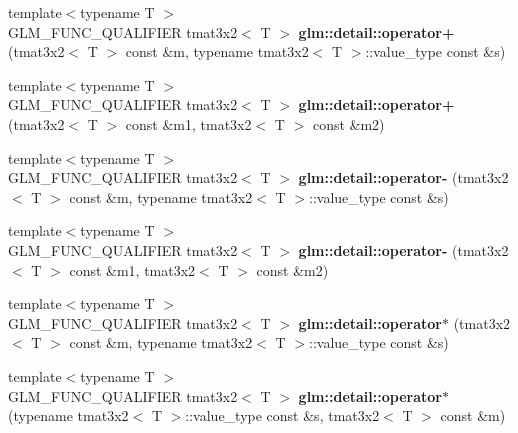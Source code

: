\begin{DoxyCompactItemize}
\item 
\hypertarget{namespaceglm_1_1detail_aaeb82124fa2780bfad15998b5477a608}{{\footnotesize template$<$typename T $>$ }\\G\-L\-M\-\_\-\-F\-U\-N\-C\-\_\-\-Q\-U\-A\-L\-I\-F\-I\-E\-R tmat3x2$<$ T $>$ {\bfseries glm\-::detail\-::operator+} (tmat3x2$<$ T $>$ const \&m, typename tmat3x2$<$ T $>$\-::value\-\_\-type const \&s)}\label{namespaceglm_1_1detail_aaeb82124fa2780bfad15998b5477a608}

\item 
\hypertarget{namespaceglm_1_1detail_a8e53f62ae79a8147b4206cfa062535bf}{{\footnotesize template$<$typename T $>$ }\\G\-L\-M\-\_\-\-F\-U\-N\-C\-\_\-\-Q\-U\-A\-L\-I\-F\-I\-E\-R tmat3x2$<$ T $>$ {\bfseries glm\-::detail\-::operator+} (tmat3x2$<$ T $>$ const \&m1, tmat3x2$<$ T $>$ const \&m2)}\label{namespaceglm_1_1detail_a8e53f62ae79a8147b4206cfa062535bf}

\item 
\hypertarget{namespaceglm_1_1detail_ae8e1ecfab5b3bd15776ab76abc60b996}{{\footnotesize template$<$typename T $>$ }\\G\-L\-M\-\_\-\-F\-U\-N\-C\-\_\-\-Q\-U\-A\-L\-I\-F\-I\-E\-R tmat3x2$<$ T $>$ {\bfseries glm\-::detail\-::operator-\/} (tmat3x2$<$ T $>$ const \&m, typename tmat3x2$<$ T $>$\-::value\-\_\-type const \&s)}\label{namespaceglm_1_1detail_ae8e1ecfab5b3bd15776ab76abc60b996}

\item 
\hypertarget{namespaceglm_1_1detail_a69a98ef51c37cfce018d17d1edc61283}{{\footnotesize template$<$typename T $>$ }\\G\-L\-M\-\_\-\-F\-U\-N\-C\-\_\-\-Q\-U\-A\-L\-I\-F\-I\-E\-R tmat3x2$<$ T $>$ {\bfseries glm\-::detail\-::operator-\/} (tmat3x2$<$ T $>$ const \&m1, tmat3x2$<$ T $>$ const \&m2)}\label{namespaceglm_1_1detail_a69a98ef51c37cfce018d17d1edc61283}

\item 
\hypertarget{namespaceglm_1_1detail_a29f8aeeb5e6eb4b49ccfb6eadf7ee8fb}{{\footnotesize template$<$typename T $>$ }\\G\-L\-M\-\_\-\-F\-U\-N\-C\-\_\-\-Q\-U\-A\-L\-I\-F\-I\-E\-R tmat3x2$<$ T $>$ {\bfseries glm\-::detail\-::operator$\ast$} (tmat3x2$<$ T $>$ const \&m, typename tmat3x2$<$ T $>$\-::value\-\_\-type const \&s)}\label{namespaceglm_1_1detail_a29f8aeeb5e6eb4b49ccfb6eadf7ee8fb}

\item 
\hypertarget{namespaceglm_1_1detail_a117d1ab40e3c26f74451b60be666c174}{{\footnotesize template$<$typename T $>$ }\\G\-L\-M\-\_\-\-F\-U\-N\-C\-\_\-\-Q\-U\-A\-L\-I\-F\-I\-E\-R tmat3x2$<$ T $>$ {\bfseries glm\-::detail\-::operator$\ast$} (typename tmat3x2$<$ T $>$\-::value\-\_\-type const \&s, tmat3x2$<$ T $>$ const \&m)}\label{namespaceglm_1_1detail_a117d1ab40e3c26f74451b60be666c174}


\end{DoxyCompactItemize}
